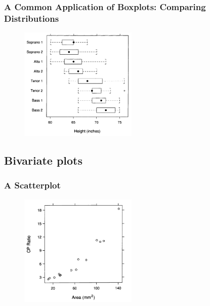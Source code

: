\documentclass[aspectratio=1610]{beamer}
\begin{document}
\begin{frame}
	\frametitle{A Common Application of Boxplots: Comparing Distributions}
	\begin{figure}
		\begin{center}
			\includegraphics[width=0.5\textwidth]{figures/comparative_boxlot.png}
		\end{center}
	\end{figure}
\end{frame}

\subsection{Bivariate plots}

\begin{frame}
	\frametitle{A Scatterplot}
	\begin{figure}
		\begin{center}
			\includegraphics[width=0.5\textwidth]{figures/scatterplot.png}
		\end{center}
	\end{figure}
\end{frame}
\end{document}
